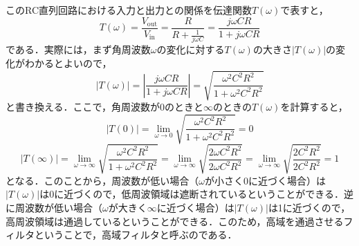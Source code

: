 このRC直列回路における入力と出力との関係を伝達関数$T(\omega)$で表すと，
\begin{equation}
T(\omega)  = \frac{V_\textrm{out}}{V_\textrm{in}} 
= \frac{R}{\displaystyle R + \frac{1}{j\omega C}}
= \frac{j\omega CR}{1 + j\omega CR} \label{eqn:hanbunsu_1}
\end{equation}
である\footnotemark ．実際には，まず角周波数$\omega$の変化に対する$T(\omega)$の大きさ$|T(\omega)|$の変化がわかるとよいので，
\begin{equation}
|T(\omega)| = \left | \frac{j\omega CR}{1 + j\omega CR} \right | 
= \displaystyle \sqrt{\frac{\omega^2 C^2 R^2}{1 + \omega^2 C^2 R^2}}
\end{equation}
と書き換える．ここで，角周波数が0のときと$\infty$のときの$T(\omega)$を計算すると，
\begin{equation}
|T(0)| = \lim_{\omega \rightarrow 0} \displaystyle \sqrt{\frac{\omega^2 C^2 R^2}{1 + \omega^2 C^2 R^2}}  = 0
\end{equation}
\begin{equation}
|T(\infty)| = \lim_{\omega \rightarrow \infty}\displaystyle \sqrt{\frac{\omega^2 C^2 R^2}{1 + \omega^2 C^2 R^2}} 
 = \lim_{\omega \rightarrow \infty}\displaystyle \sqrt{\frac{2\omega C^2 R^2}{ 2\omega C^2 R^2}} 
 = \lim_{\omega \rightarrow \infty}\displaystyle \sqrt{\frac{2 C^2 R^2}{ 2 C^2 R^2}}  = 1
\end{equation}
となる．このことから，周波数が低い場合（$\omega$が小さく0に近づく場合）は$|T(\omega)|$は0に近づくので，低周波領域は遮断されているということができる．逆に周波数が低い場合（$\omega$が大きく$\infty$に近づく場合）は$|T(\omega)|$は1に近づくので，高周波領域は通過しているということができる\footnotemark ．このため，高域を通過させるフィルタということで，高域フィルタと呼ぶのである．


